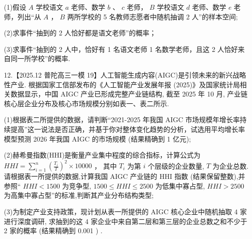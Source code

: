 \documentclass[10pt]{article}
\begin{document}
(1)假设 \(A\) 学校语文 \(a\) 老师、数学 \(b\text{ 、 }c\) 老师， \(B\) 学校语文 \(d\) 老师、数学 \(e\) 老师，列出“从 \(A\) ， \(B\) 两所学校的 5 名教师志愿者中随机抽调 2 人”的样本空间;

(2)求事件“抽到的 2 人恰好都是语文老师”的概率；

(3)求事件“抽到的 2 人中，恰好有 1 名语文老师 1 名数学老师，且这 2 人恰好来自同一所学校”的概率.

12.【2025.12 普陀高三一模 19】人工智能生成内容(AIGC)是引领未来的新兴战略性产业. 根据国家工信部发布的《人工智能产业发展年报 (2025)》及国家统计局相关数据显示，中国 AIGC 产业已形成完整产业链结构, 截至 2025 年 10 月, 产业链核心层企业分布及核心市场规模分别如表一、表二所示.

\begin{center}
\end{center}

(1)根据表二所提供的数据，请判断“2021-2025 年我国 AIGC 市场规模年增长率持续提高”这一说法是否正确，并基于你对整体变化趋势的分析，试选用平均增长率模型预测 2026 年我国 AIGC 的市场规模 (结果精确到 1 亿元);

(2)赫希曼指数(HHI)是衡量产业集中程度的综合指标，计算公式为 \({HHI} = \mathop{\sum }\limits_{{i = 1}}^{n}{\left( \frac{{T}_{i}}{T}\right) }^{2} \times  {10000}\) ， 其中 \({T}_{i}\) 为第 \(i\) 个层级的企业数量, \(T\) 为企业总数. 请根据表一所提供的数据,计算我国 AIGC 产业链的 HHI 指数 (结果保留整数),并参照“ \({HHI} < {1500}\) 为竞争型, \({1500} \leq  {HHI} \leq  {2500}\) 为低集中寡占型, \({HHI} > {2500}\) 为高集中寡占型”的标准,判断其产业分布结构类型;

(3)为制定产业支持政策，现计划从表一所提供的 AIGC 核心企业中随机抽取 4 家进行深度调研, 求抽到的这 4 家企业中来自第二层和第三层的企业总数之和不少于 2 家的概率 (结果精确到 0.001 ) .
\end{document}
